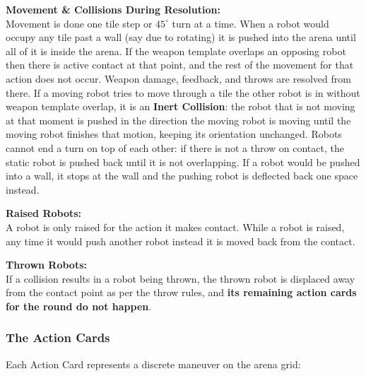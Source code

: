 \documentclass[11pt,a4paper]{article}
\begin{document}
\noindent
\textbf{Movement \& Collisions During Resolution:}\\
Movement is done one tile step or $45^\circ$ turn at a time. When a robot would occupy any tile past a wall (say due to rotating) it is pushed into the arena until all of it is inside the arena. If the weapon template overlaps an opposing robot then there is active contact at that point, and the rest of the movement for that action does not occur. Weapon damage, feedback, and throws are resolved from there.
If a moving robot tries to move through a tile the other robot is in without weapon template overlap, it is an \textbf{Inert Collision}: the robot that is not moving at that moment is pushed in the direction the moving robot is moving until the moving robot finishes that motion, keeping its orientation unchanged. Robots cannot end a turn on top of each other: if there is not a throw on contact, the static robot is pushed back until it is not overlapping. If a robot would be pushed into a wall, it stops at the wall and the pushing robot is deflected back one space instead.

\vspace{0.3em}
\noindent
\textbf{Raised Robots:}\\
A robot is only raised for the action it makes contact. While a robot is raised, any time it would push another robot instead it is moved back from the contact.

\vspace{0.3em}
\noindent
\textbf{Thrown Robots:}\\
If a collision results in a robot being thrown, the thrown robot is displaced away from the contact point as per the throw rules, and \textbf{its remaining action cards for the round do not happen}.

\clearpage

\subsubsection{The Action Cards}
Each Action Card represents a discrete maneuver on the arena grid:
\end{document}
